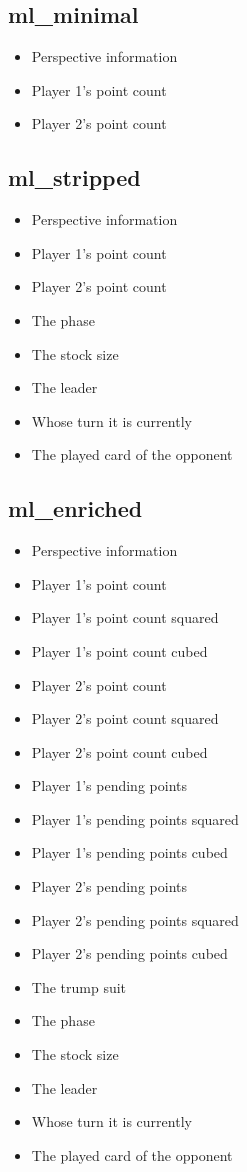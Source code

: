 \documentclass[a4paper,11pt]{article}
\begin{document}
\subsection{ml\_minimal}
\begin{itemize}
\item Perspective information
\item Player 1's point count
\item Player 2's point count
\end{itemize}
\subsection{ml\_stripped}
\begin{itemize}
\item Perspective information
\item Player 1's point count
\item Player 2's point count
\item The phase
\item The stock size
\item The leader
\item Whose turn it is currently
\item The played card of the opponent
\end{itemize}
\subsection{ml\_enriched}
\begin{itemize}
\item Perspective information
\item Player 1's point count
\item Player 1's point count squared
\item Player 1's point count cubed
\item Player 2's point count
\item Player 2's point count squared
\item Player 2's point count cubed
\item Player 1's pending points
\item Player 1's pending points squared
\item Player 1's pending points cubed
\item Player 2's pending points
\item Player 2's pending points squared
\item Player 2's pending points cubed
\item The trump suit
\item The phase
\item The stock size
\item The leader
\item Whose turn it is currently
\item The played card of the opponent
\end{itemize}
\end{document}
